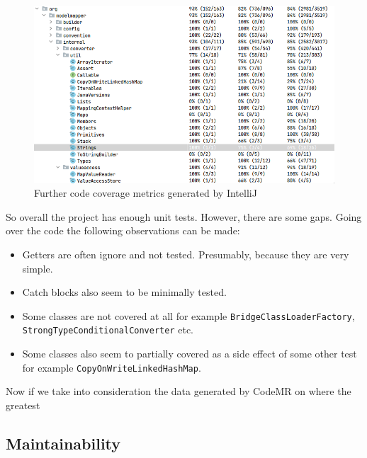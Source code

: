 \documentclass[12pt]{article}
\begin{document}
\begin{figure}[H]
    \centering
    \includegraphics[width=14cm]{images/code-coverage-2.png}
    \caption{Further code coverage metrics generated by IntelliJ}
    \label{intellij-code-coverage-2}
\end{figure}

So overall the project has enough unit tests. However, there are
some gaps. Going over the code the following observations can be
made:

\begin{itemize}
    \item Getters are often ignore and not tested. Presumably,
        because they are very simple.
    \item Catch blocks also seem to be minimally tested.
    \item Some classes are not covered at all for example
        \texttt{BridgeClassLoaderFactory}, \linebreak
        \texttt{StrongTypeConditionalConverter} etc.
    \item Some classes also seem to partially covered as a side
        effect of some other test for example
        \texttt{CopyOnWriteLinkedHashMap}.
\end{itemize}

Now if we take into consideration the data generated by CodeMR
on where the greatest 


\subsection{Maintainability}
\end{document}
